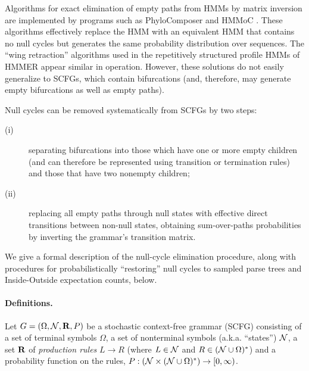\documentclass[10pt]{article}
\begin{document}
Algorithms for exact elimination of empty paths from HMMs by matrix inversion are implemented
by programs such as PhyloComposer \cite{Holmes2003,Holmes2007} and
HMMoC \cite{Lunter2007}. These algorithms effectively replace the HMM
with an equivalent HMM that contains no null cycles but generates the
same probability distribution over sequences.
The ``wing retraction'' algorithms used in the repetitively structured profile HMMs of HMMER \cite{hmmer} appear similar in operation.
However, these solutions do not easily generalize to SCFGs, which contain bifurcations
(and, therefore, may generate empty bifurcations as well as empty paths).

Null cycles can be removed systematically from SCFGs by two steps:
\begin{description}
\item[(i)] separating bifurcations
into those which have one or more empty children (and can therefore be
represented using transition or termination rules) and those that have
two nonempty children;
\item[(ii)] replacing all empty paths through null states with effective direct transitions between non-null states,
obtaining sum-over-paths probabilities by inverting the grammar's transition matrix.
\end{description}

We give a formal description of the null-cycle elimination procedure,
along with procedures for probabilistically ``restoring'' null cycles
to sampled parse trees and Inside-Outside expectation counts, below.


\paragraph{Definitions.}

Let $G = ( \Omega, {\cal N}, {\bf R}, P )$ be a stochastic context-free grammar (SCFG)
consisting of
a set of terminal symbols $\Omega$,
a set of nonterminal symbols (a.k.a. ``states'') ${\cal N}$,
a set ${\bf R}$ of {\em production rules} $L \to R$ (where $L \in {\cal N}$ and $R \in ( {\cal N} \cup \Omega )^\ast$)
and a probability function on the rules, $P:({\cal N} \times ( {\cal N} \cup \Omega )^\ast) \to [0,\infty)$.

\end{document}
